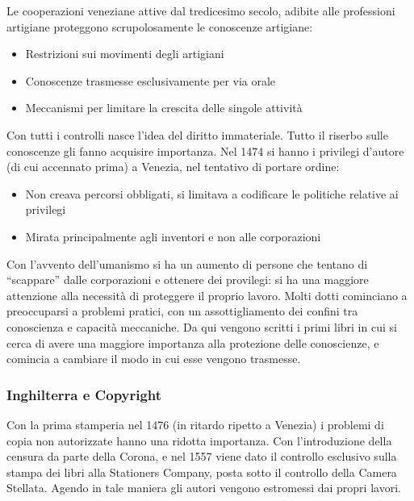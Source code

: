 Le cooperazioni veneziane attive dal tredicesimo secolo, adibite alle professioni artigiane proteggono scrupolosamente le conoscenze artigiane:
\begin{itemize}

\item Restrizioni sui movimenti degli artigiani
\item Conoscenze trasmesse esclusivamente per via orale
\item Meccanismi per limitare la crescita delle singole attivit\`a

\end{itemize}

Con tutti i controlli nasce l'idea del diritto immateriale. Tutto il riserbo sulle conoscenze gli fanno acquisire importanza. Nel 1474 si hanno i privilegi d'autore (di cui accennato prima) a Venezia, nel tentativo di portare ordine:

\begin{itemize}

\item Non creava percorsi obbligati, si limitava a codificare le politiche relative ai privilegi

\item Mirata principalmente agli inventori e non alle corporazioni

\end{itemize}

Con l'avvento dell'umanismo si ha un aumento di persone che tentano di ``scappare'' dalle corporazioni e ottenere dei provilegi: si ha una maggiore attenzione alla necessit\`a di proteggere il proprio lavoro. Molti dotti cominciano a preoccuparsi a problemi pratici, con un assottigliamento dei confini tra conoscienza e capacit\`a meccaniche. Da qui vengono scritti i primi libri in cui si cerca di avere una maggiore importanza alla protezione delle conoscienze, e comincia a cambiare il modo in cui esse vengono trasmesse.


\subsubsection{Inghilterra e Copyright}

Con la prima stamperia nel 1476 (in ritardo ripetto a Venezia) i problemi di copia non autorizzate hanno una ridotta importanza. Con l'introduzione della censura da parte della Corona, e nel 1557 viene dato il controllo esclusivo sulla stampa dei libri alla Stationers Company, posta sotto il controllo della Camera Stellata. Agendo in tale maniera gli autori vengono estromessi dai propri lavori.

